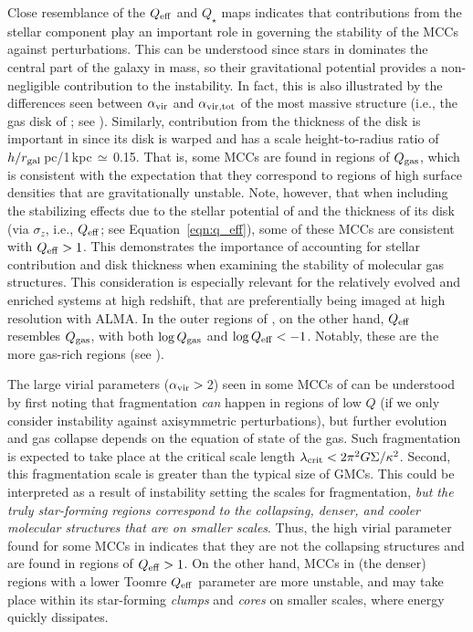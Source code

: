 \IfFileExists{emulateapjlegacy.cls}{\documentclass[iop]{emulateapjlegacy}}{\documentclass[iop]{emulateapj}}
\begin{document}
Close resemblance of the $Q_{\rm eff}$ and $Q_{\star}$ maps indicates that contributions from the stellar component play an important role in governing the stability of the MCCs against perturbations. This can be understood since stars in \flower dominates the central part of the galaxy in mass, so their gravitational potential provides a non-negligible contribution to the instability. In fact, this is also illustrated by the differences seen between $\alpha_{\rm vir}$ and $\alpha_{\rm vir, tot}$ 
of the most massive structure (i.e., the gas disk of \flower; see ).
Similarly, contribution from the thickness of the disk is important in \flower since its disk is warped and has a scale height-to-radius ratio of $h/r_{\rm gal}$\,pc/1\,kpc\,$\simeq$\,0.15.
% 
That is, some MCCs are found in regions of $Q_{\rm gas}$, which is consistent with the expectation that they correspond to regions of high surface densities that are gravitationally unstable. Note, however, that when including the stabilizing effects due to the stellar potential of \flower and the thickness of its disk (via $\sigma_z$, i.e., $Q_{\rm eff}$; see Equation~\ref{eqn:q_eff}), some of these MCCs are consistent with $Q_{\rm eff} > 1$. 
%
This demonstrates the importance of accounting for stellar contribution and disk thickness when examining the stability of molecular gas structures. This consideration is especially relevant for the relatively evolved and enriched systems at high redshift, that are preferentially being imaged at high resolution with ALMA. In the outer regions of \flower, on the other hand, $Q_{\rm eff}$ resembles $Q_{\rm gas}$, with both $\log{Q_{\rm gas}}$ and $\log{Q_{\rm eff}} < -1$. Notably, these are the more gas-rich regions (see ).

The large virial parameters ($\alpha_{\rm vir}>$\,2) seen in some MCCs of \flower can be understood by first noting that fragmentation {\em can} happen in regions of low $Q$ (if we only consider instability against axisymmetric perturbations), but further evolution and gas collapse depends on the equation of state of the gas.
%
Such fragmentation is expected to take place at the critical scale length $\lambda_{\rm crit} < 2 \pi^2 G \Sigma / \kappa^2$. Second, this fragmentation scale is greater than the typical size of GMCs.
%
This could be interpreted as a result of instability setting the scales for fragmentation, {\em but the truly star-forming regions correspond to the collapsing, denser, and cooler molecular structures that are on smaller scales}.
%
Thus, the high virial parameter found for some MCCs in \flower indicates that they are not the collapsing structures and are found in regions of $Q_{\rm eff}>1$. On the other hand, MCCs in (the denser) regions with a lower Toomre $Q_{\rm eff}$ parameter are more unstable, and \SF may take place within its star-forming {\it clumps} and {\it cores} on smaller scales, where energy quickly dissipates.
\end{document}
